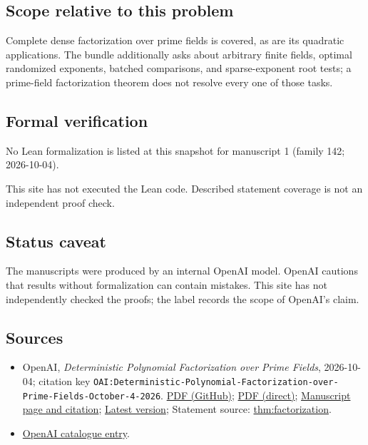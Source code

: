 \documentclass[11pt]{article}
\begin{document}
\subsection{Scope relative to this problem}
Complete dense factorization over prime fields is covered, as are its quadratic applications. The bundle additionally asks about arbitrary finite fields, optimal randomized exponents, batched comparisons, and sparse-exponent root tests; a prime-field factorization theorem does not resolve every one of those tasks.

\subsection{Formal verification}
No Lean formalization is listed at this snapshot for manuscript 1 (family 142; 2026-10-04).

This site has not executed the Lean code. Described statement coverage is not an independent proof check.

\subsection{Status caveat}
The manuscripts were produced by an internal OpenAI model. OpenAI cautions that results without formalization can contain mistakes. This site has not independently checked the proofs; the label records the scope of OpenAI's claim.

\subsection{Sources}
\begin{itemize}
\item OpenAI, \emph{Deterministic Polynomial Factorization over Prime Fields}, 2026-10-04; citation key \texttt{OAI:Deterministic-Polynomial-Factorization-over-Prime-Fields-October-4-2026}. \href{https://github.com/openai/math/blob/adc7f1241b42e322a6451854ab7e4b4c146bf78a/preprints/Deterministic-Polynomial-Factorization-over-Prime-Fields-October-4-2026/Deterministic-Polynomial-Factorization-over-Prime-Fields.pdf}{PDF (GitHub)}; \href{https://github.com/openai/math/raw/adc7f1241b42e322a6451854ab7e4b4c146bf78a/preprints/Deterministic-Polynomial-Factorization-over-Prime-Fields-October-4-2026/Deterministic-Polynomial-Factorization-over-Prime-Fields.pdf}{PDF (direct)}; \href{https://github.com/openai/math/blob/adc7f1241b42e322a6451854ab7e4b4c146bf78a/preprints/Deterministic-Polynomial-Factorization-over-Prime-Fields-October-4-2026/README.md}{Manuscript page and citation}; \href{https://github.com/openai/math/blob/main/preprints/Deterministic-Polynomial-Factorization-over-Prime-Fields-October-4-2026/Deterministic-Polynomial-Factorization-over-Prime-Fields.pdf}{Latest version}; Statement source: \href{https://github.com/openai/math/blob/adc7f1241b42e322a6451854ab7e4b4c146bf78a/preprints/Deterministic-Polynomial-Factorization-over-Prime-Fields-October-4-2026/build/sections/00-introduction.tex\#L27}{thm:factorization}.
\item \href{https://github.com/openai/math/blob/adc7f1241b42e322a6451854ab7e4b4c146bf78a/CONTENTS.md}{OpenAI catalogue entry}.
\end{itemize}
\end{document}
